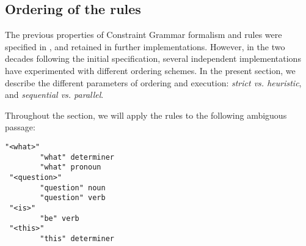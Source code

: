 \subsection{Ordering of the rules}\label{ordering}

The previous properties of Constraint Grammar formalism and rules were specified in \cite{karlsson1995constraint}, and retained in further implementations. 
However, in the two decades following the initial specification, 
several independent implementations have experimented with different ordering
schemes. In the present section, we describe the different parameters of ordering and execution: \emph{strict vs. heuristic}, and \emph{sequential vs. parallel}.



Throughout the section, we will apply the rules to the following ambiguous passage:

\begin{verbatim}
"<what>"
        "what" determiner
        "what" pronoun                                        
 "<question>"
        "question" noun
        "question" verb
 "<is>"
        "be" verb
 "<this>"
        "this" determiner
\end{verbatim}

